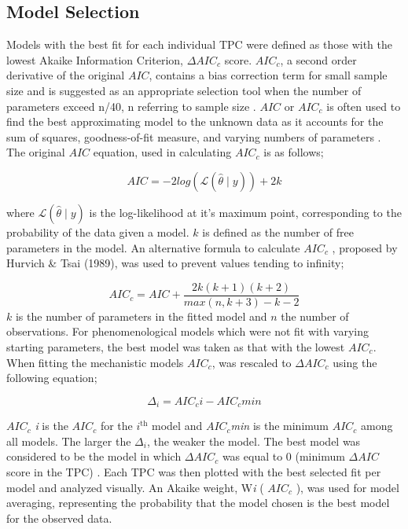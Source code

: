 \documentclass[11pt]{article}
\begin{document}
\begin{linenumbers}
\subsection{Model Selection}
Models with the best fit for each individual TPC were defined as those with the lowest Akaike Information Criterion, \(\Delta AIC_c\) score. \(AIC_c\), a second order derivative of the original \(AIC\), contains a bias correction term for small sample size and is suggested as an appropriate selection tool when the number of parameters exceed n/40, n referring to sample size \cite{article2}. \(AIC\) or \(AIC_c\) is often used to find the best approximating model to the unknown data as it accounts for the sum of squares, goodness-of-fit measure, and varying numbers of parameters \cite{citeulike:4425594}. The original \(AIC\) equation, used in calculating \(AIC_c\) is as follows;

\begin{equation}
AIC = -2log({\mathcal{L}}(\hat{\theta}\mid y)) + 2k \tag{6}
\end{equation}

where $\mathcal{L}(\hat{\theta}\mid y)$ is the log-likelihood at it's maximum point, corresponding to the probability of the data given a model. \(k\) is defined as the number of free parameters in the model. An alternative formula to calculate \(AIC_c\) , proposed by Hurvich \& Tsai (1989), was used to prevent values tending to infinity;

\begin{equation}
AIC_c = AIC + \frac{2k(k+1)(k+2)}{max(n,k +3) - k - 2}\tag{7}
\end{equation}
\vspace{0.1cm}
\(k\) is the number of parameters in the fitted model and \(n\) the number of observations. For phenomenological models which were not fit with varying starting parameters, the best model was taken as that with the lowest \(AIC_c\). When fitting the mechanistic models \(AIC_c\), was rescaled to \(\Delta AIC_c\) using the following equation;

\begin{equation}
\Delta_i = AIC_c i - AIC_c min \tag{8}
\end{equation}


\( AIC_c \) \textit{i} is the \(AIC_c\) for the $i^{\text{th}}$ model and \(AIC_c\)\textit{min} is the minimum \(AIC_c\) among all models. The larger the \(\Delta_i\), the weaker the model. The best model was considered to be the model in which \(\Delta AIC_c\) was equal to 0 (minimum \(\Delta AIC\) score in the TPC) \cite{article3}. Each TPC was then plotted with the best selected fit per model and analyzed visually. An Akaike weight, W\textit{i} ( \(AIC_c\) ), was used for model averaging, representing the probability that the model chosen is the best model for the observed data.


\end{linenumbers}
\end{document}
